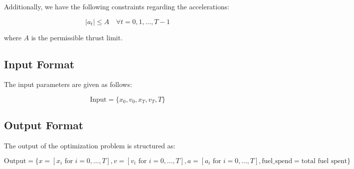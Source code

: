 \documentclass{article}
\begin{document}
Additionally, we have the following constraints regarding the accelerations:

\[
|a_t| \leq A \quad \forall t = 0, 1, \ldots, T-1
\]

where \( A \) is the permissible thrust limit.

\subsection*{Input Format}
The input parameters are given as follows:

\[
\text{Input} = \{ x_0, v_0, x_T, v_T, T \}
\]

\subsection*{Output Format}
The output of the optimization problem is structured as:

\[
\text{Output} = \{ 
    x = [x_i \text{ for } i = 0, \ldots, T], 
    v = [v_i \text{ for } i = 0, \ldots, T], 
    a = [a_i \text{ for } i = 0, \ldots, T], 
    \text{fuel\_spend} = \text{total fuel spent}
\}
\]
\end{document}
